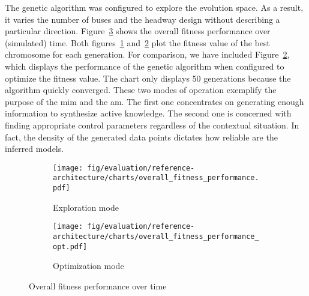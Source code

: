The genetic algorithm was configured to explore the evolution space. As a result, it varies the number of buses and the headway design without describing a particular direction. Figure~\ref{fig:evaluation--suts-overall-performance} shows the overall fitness performance over (simulated) time. Both figures~\ref{fig:evaluation--suts-performance-exploration} and~\ref{fig:evaluation--suts-performance-optimization} plot the fitness value of the best chromosome for each generation. For comparison, we have included Figure~\ref{fig:evaluation--suts-performance-optimization}, which displays the performance of the genetic algorithm when configured to optimize the fitness value. The chart only displays 50 generations because the algorithm quickly converged. These two modes of operation exemplify the purpose of the \gls{mim} and the \gls{am}. The first one concentrates on generating enough information to synthesize active knowledge. The second one is concerned with finding appropriate control parameters regardless of the contextual situation. In fact, the density of the generated data points dictates how reliable are the inferred models.

\begin{figure}[h]
	\centering
	\begin{subfigure}[b]{0.49\textwidth}
		\texttt{[image: fig/evaluation/reference-architecture/charts/overall\_fitness\_performance.pdf]}
		\caption{Exploration mode}
		\label{fig:evaluation--suts-performance-exploration}
	\end{subfigure}
	\begin{subfigure}[b]{0.49\textwidth}
		\texttt{[image: fig/evaluation/reference-architecture/charts/overall\_fitness\_performance\_opt.pdf]}
		\caption{Optimization mode}
		\label{fig:evaluation--suts-performance-optimization}
	\end{subfigure}
	\caption{Overall fitness performance over time}
	\label{fig:evaluation--suts-overall-performance}
\end{figure}

